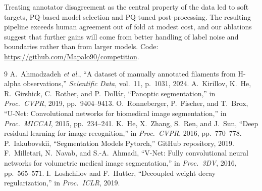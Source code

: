 \documentclass[10pt,twocolumn,letterpaper]{article}
\makeatletter
\renewcommand{\section}{\@ifstar{\fil@sec}{\fil@sec}}
\newcommand{\fil@sec}[1]{\par\smallskip\noindent{\normalsize\bfseries\MakeUppercase{#1}}\par\smallskip}
\makeatother
\begin{document}
\section{Conclusion}
Treating annotator disagreement as the central property of the data led to soft targets, PQ-based model
selection and PQ-tuned post-processing. The resulting pipeline exceeds human agreement out of fold at modest
cost, and our ablations suggest that further gains will come from better handling of label noise and
boundaries rather than from larger models. Code: \url{https://github.com/Mapalo90/competition}.

\balance
{\footnotesize
\begin{thebibliography}{9}
\setlength{\itemsep}{0pt}
 A.~Ahmadzadeh \emph{et al.}, ``A dataset of manually annotated filaments from H-alpha
observations,'' \emph{Scientific Data}, vol.~11, p.~1031, 2024.
 A.~Kirillov, K.~He, R.~Girshick, C.~Rother, and P.~Doll\'ar, ``Panoptic segmentation,''
in \emph{Proc.\ CVPR}, 2019, pp.~9404--9413.
 O.~Ronneberger, P.~Fischer, and T.~Brox, ``U-Net: Convolutional networks for biomedical image
segmentation,'' in \emph{Proc.\ MICCAI}, 2015, pp.~234--241.
 K.~He, X.~Zhang, S.~Ren, and J.~Sun, ``Deep residual learning for image recognition,'' in
\emph{Proc.\ CVPR}, 2016, pp.~770--778.
 P.~Iakubovskii, ``Segmentation Models Pytorch,'' GitHub repository, 2019.
 F.~Milletari, N.~Navab, and S.-A.~Ahmadi, ``V-Net: Fully convolutional neural networks for
volumetric medical image segmentation,'' in \emph{Proc.\ 3DV}, 2016, pp.~565--571.
 I.~Loshchilov and F.~Hutter, ``Decoupled weight decay regularization,'' in \emph{Proc.\ ICLR},
2019.
\end{thebibliography}}
\end{document}
